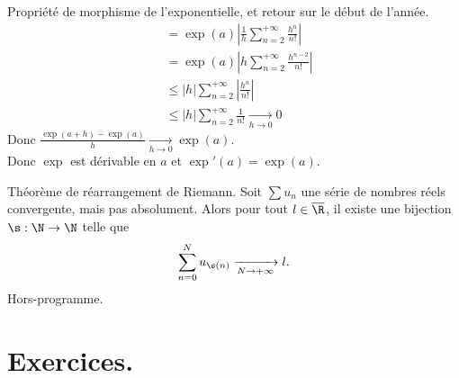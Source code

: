 \documentclass[11pt]{article}
\begin{document}
\begin{ex}{Propriété de morphisme de l'exponentielle, et retour sur le début de l'année.}{}
\begin{align*}
        &=\exp(a)\left| \frac{1}{h}\sum\limits_{n=2}^{+\infty}\frac{h^n}{n!} \right|\\
        &=\exp(a)\left| h\sum_{n=2}^{+\infty}\frac{h^{n-2}}{n!} \right|\\
        &\leq |h|\sum_{n=2}^{+\infty}\left|\frac{h^n}{n!}\right|\\
        &\leq |h|\sum_{n=2}^{+\infty}\frac{1}{n!} \xrightarrow[h\to0]{} 0
    \end{align*}
    Donc $\frac{\exp(a+h)-\exp(a)}{h}\xrightarrow[h\to0]{}\exp(a)$.\\
    Donc $\exp$ est dérivable en $a$ et $\exp'(a)=\exp(a)$. 
\end{ex}

\begin{thm}{Théorème de réarrangement de Riemann.}{}
    Soit $\sum u_n$ une série de nombres réels convergente, mais pas absolument. Alors pour tout $l\in\overline{\R}$, il existe une bijection $\s:\N\to\N$ telle que \begin{equation*}\sum_{n=0}^Nu_{\s(n)}\xrightarrow[N\to+\infty]{}l.\end{equation*}
    \tcblower
    Hors-programme.
\end{thm}

\pagebreak

\section{Exercices.}
\end{document}
